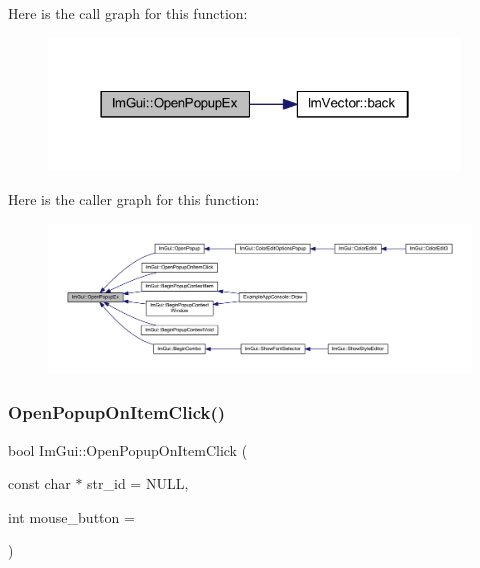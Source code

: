 Here is the call graph for this function\+:
\nopagebreak
\begin{figure}[H]
\begin{center}
\leavevmode
\includegraphics[width=310pt]{namespace_im_gui_a6ce26d34d09c7657d7abd8e28cbb1b85_cgraph}
\end{center}
\end{figure}
Here is the caller graph for this function\+:
\nopagebreak
\begin{figure}[H]
\begin{center}
\leavevmode
\includegraphics[width=350pt]{namespace_im_gui_a6ce26d34d09c7657d7abd8e28cbb1b85_icgraph}
\end{center}
\end{figure}
\mbox{\label{namespace_im_gui_a546fc46d8f510cb17a2f272891e2f5b3}} 
\subsubsection{\texorpdfstring{Open\+Popup\+On\+Item\+Click()}{OpenPopupOnItemClick()}}
{\footnotesize\ttfamily bool Im\+Gui\+::\+Open\+Popup\+On\+Item\+Click (\begin{DoxyParamCaption}\item[{const char $\ast$}]{str\+\_\+id = {\ttfamily NULL},  }\item[{int}]{mouse\+\_\+button = {} }\end{DoxyParamCaption})}

